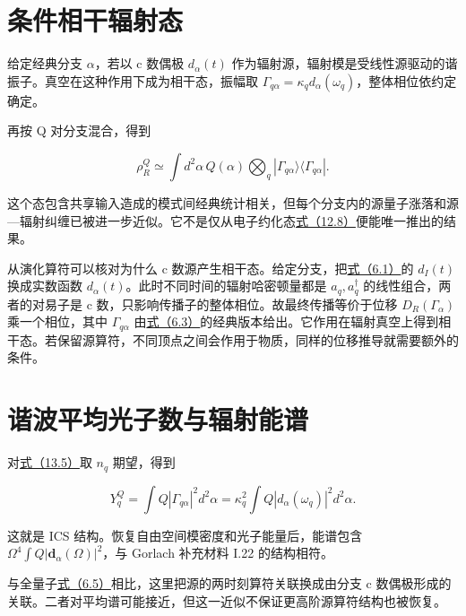 \documentclass[UTF8,a4paper,zihao=-4,openany,fontset=fandol]{ctexbook}
\begin{document}
\section{条件相干辐射态}\label{sec:13:7}


给定经典分支 $\alpha$，若以 c 数偶极 $d_\alpha(t)$ 作为辐射源，辐射模是受线性源驱动的谐振子。真空在这种作用下成为相干态，振幅取 $\Gamma_{q\alpha}=\kappa_qd_\alpha(\omega_q)$，整体相位依约定确定。



再按 Q 对分支混合，得到



\begin{equation*}
\rho_R^{Q}\simeq\int d^2\alpha\,Q(\alpha)
\bigotimes_q|\Gamma_{q\alpha}\rangle\langle\Gamma_{q\alpha}|.
\tag{13.5}\label{eq:13.5}
\end{equation*}


这个态包含共享输入造成的模式间经典统计相关，但每个分支内的源量子涨落和源—辐射纠缠已被进一步近似。它不是仅从电子约化态\hyperref[eq:12.8]{式（12.8）}便能唯一推出的结果。



从演化算符可以核对为什么 c 数源产生相干态。给定分支，把\hyperref[eq:6.1]{式（6.1）}的 $d_I(t)$ 换成实数函数 $d_\alpha(t)$。此时不同时间的辐射哈密顿量都是 $a_q,a_q^\dagger$ 的线性组合，两者的对易子是 c 数，只影响传播子的整体相位。故最终传播等价于位移 $D_R(\Gamma_\alpha)$ 乘一个相位，其中 $\Gamma_{q\alpha}$ 由\hyperref[eq:6.3]{式（6.3）}的经典版本给出。它作用在辐射真空上得到相干态。若保留源算符，不同顶点之间会作用于物质，同样的位移推导就需要额外的条件。



\section{谐波平均光子数与辐射能谱}\label{sec:13:8}


对\hyperref[eq:13.5]{式（13.5）}取 $n_q$ 期望，得到



\begin{equation*}
Y_q^Q=\int Q|\Gamma_{q\alpha}|^2d^2\alpha
=\kappa_q^2\int Q|d_\alpha(\omega_q)|^2d^2\alpha.
\tag{13.6}\label{eq:13.6}
\end{equation*}


这就是 ICS 结构。恢复自由空间模密度和光子能量后，能谱包含 $\Omega^4\int Q|\mathbf d_\alpha(\Omega)|^2$，与 Gorlach 补充材料 I.22 的结构相符。



与全量子\hyperref[eq:6.5]{式（6.5）}相比，这里把源的两时刻算符关联换成由分支 c 数偶极形成的关联。二者对平均谱可能接近，但这一近似不保证更高阶源算符结构也被恢复。
\end{document}
